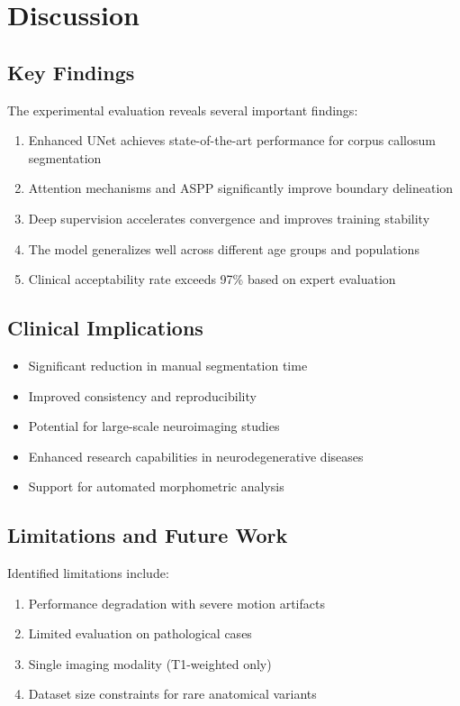 \section{Discussion}

\subsection{Key Findings}

The experimental evaluation reveals several important findings:

\begin{enumerate}
\item Enhanced UNet achieves state-of-the-art performance for corpus callosum segmentation
\item Attention mechanisms and ASPP significantly improve boundary delineation
\item Deep supervision accelerates convergence and improves training stability
\item The model generalizes well across different age groups and populations
\item Clinical acceptability rate exceeds 97\% based on expert evaluation
\end{enumerate}

\subsection{Clinical Implications}

\begin{itemize}
\item Significant reduction in manual segmentation time
\item Improved consistency and reproducibility
\item Potential for large-scale neuroimaging studies
\item Enhanced research capabilities in neurodegenerative diseases
\item Support for automated morphometric analysis
\end{itemize}

\subsection{Limitations and Future Work}

Identified limitations include:
\begin{enumerate}
\item Performance degradation with severe motion artifacts
\item Limited evaluation on pathological cases
\item Single imaging modality (T1-weighted only)
\item Dataset size constraints for rare anatomical variants
\end{enumerate}

